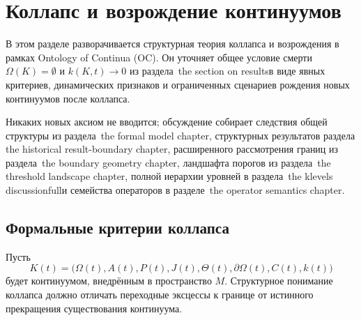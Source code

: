
\section{Коллапс и возрождение континуумов}
\label{sec:collapse-rebirth}

В этом разделе разворачивается структурная теория коллапса и возрождения
в рамках Ontology of Continua (OC). Он уточняет общее условие смерти
\(\Omega(K)=\emptyset\) и \(k(K,t)\to 0\) из
раздела~the section on resultsв виде явных критериев, динамических признаков и
ограниченных сценариев рождения новых континуумов после коллапса.

Никаких новых аксиом не вводится; обсуждение собирает следствия общей
структуры из раздела~the formal model chapter, структурных результатов раздела
the historical result-boundary chapter, расширенного рассмотрения границ из
раздела~the boundary geometry chapter, ландшафта порогов из
раздела~the threshold landscape chapter, полной иерархии уровней в
раздела~the klevels discussionfullи семейства операторов в
разделе~the operator semantics chapter.

\subsection{Формальные критерии коллапса}

Пусть
\[
  K(t) =
  \big(
    \Omega(t), A(t), P(t), J(t),
    \Theta(t), \partial\Omega(t), C(t), k(t)
  \big)
\]
будет континуумом, внедрённым в пространство \(M\). Структурное понимание
коллапса должно отличать переходные эксцессы к границе от истинного прекращения
существования континуума.

